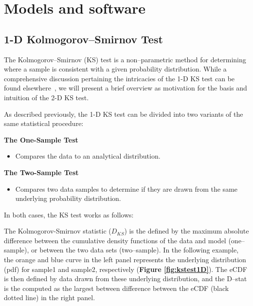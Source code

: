 \documentclass[codesnippet]{jss}
\begin{document}


\section{Models and software} \label{sec:models}

\subsection{1-D Kolmogorov--Smirnov Test}

The Kolmogorov--Smirnov (KS) test is a non--parametric method for determining where a sample is consistent with a given probability distribution. While a comprehensive discussion pertaining the intricacies of the 1-D KS test can be found elsewhere~\citep{Stephens1992a}, we will present a brief overview as motivation for the basis and intuition of the 2-D KS test.

As described previously, the 1-D KS test can be divided into two variants of the same statistical procedure:

\begin{leftbar}
\textbf{The One-Sample Test}
\begin{itemize}
\item Compares the data to an analytical distribution.
\end{itemize}
\textbf{The Two-Sample Test}
\begin{itemize}
\item Compares two data samples to determine if they are drawn from the same underlying probability distribution.
\end{itemize}
\end{leftbar}

In both cases, the KS test works as follows:

The Kolmogorov-Smirnov statistic ($D_{KS}$) is the defined by the maximum absolute difference between the cumulative density functions of the data and model (one--sample), or between the two data sets (two--sample). In the following example, the orange and blue curve in the left panel represents the underlying distribution (pdf) for sample1 and sample2, respectively (\textbf{Figure \ref{fig:kstest1D}}). The eCDF is then defined by data drawn from these underlying distribution, and the D--stat is the computed as the largest between difference between the eCDF (black dotted line) in the right panel.
\end{document}
